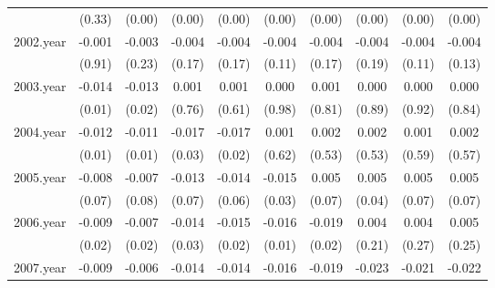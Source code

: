 {\begin{tabular}{l*{9}{c}}
          &   (0.33)         &   (0.00)         &   (0.00)         &   (0.00)         &   (0.00)         &   (0.00)         &   (0.00)         &   (0.00)         &   (0.00)         \\
[1em]
2002.year &   -0.001         &   -0.003         &   -0.004         &   -0.004         &   -0.004         &   -0.004         &   -0.004         &   -0.004         &   -0.004         \\
          &   (0.91)         &   (0.23)         &   (0.17)         &   (0.17)         &   (0.11)         &   (0.17)         &   (0.19)         &   (0.11)         &   (0.13)         \\
[1em]
2003.year &   -0.014\sym{*}  &   -0.013\sym{*}  &    0.001         &    0.001         &    0.000         &    0.001         &    0.000         &    0.000         &    0.000         \\
          &   (0.01)         &   (0.02)         &   (0.76)         &   (0.61)         &   (0.98)         &   (0.81)         &   (0.89)         &   (0.92)         &   (0.84)         \\
[1em]
2004.year &   -0.012\sym{*}  &   -0.011\sym{*}  &   -0.017\sym{*}  &   -0.017\sym{*}  &    0.001         &    0.002         &    0.002         &    0.001         &    0.002         \\
          &   (0.01)         &   (0.01)         &   (0.03)         &   (0.02)         &   (0.62)         &   (0.53)         &   (0.53)         &   (0.59)         &   (0.57)         \\
[1em]
2005.year &   -0.008         &   -0.007         &   -0.013         &   -0.014         &   -0.015\sym{*}  &    0.005         &    0.005\sym{*}  &    0.005         &    0.005         \\
          &   (0.07)         &   (0.08)         &   (0.07)         &   (0.06)         &   (0.03)         &   (0.07)         &   (0.04)         &   (0.07)         &   (0.07)         \\
[1em]
2006.year &   -0.009\sym{*}  &   -0.007\sym{*}  &   -0.014\sym{*}  &   -0.015\sym{*}  &   -0.016\sym{**} &   -0.019\sym{*}  &    0.004         &    0.004         &    0.005         \\
          &   (0.02)         &   (0.02)         &   (0.03)         &   (0.02)         &   (0.01)         &   (0.02)         &   (0.21)         &   (0.27)         &   (0.25)         \\
[1em]
2007.year &   -0.009\sym{**} &   -0.006\sym{*}  &   -0.014\sym{*}  &   -0.014\sym{*}  &   -0.016\sym{**} &   -0.019\sym{**} &   -0.023\sym{**} &   -0.021\sym{**} &   -0.022\sym{**} \\

\end{tabular}}
